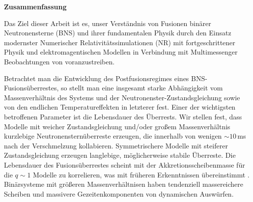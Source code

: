 \newpage 

%
%

\textbf{\Large{Zusammenfassung} }

Das Ziel dieser Arbeit ist es, unser Verständnis von Fusionen binärer Neutronensterne (BNS)
und ihrer fundamentalen Physik durch den Einsatz modernster Numerischer Relativit\"atssimulationen (NR) mit
fortgeschrittener Physik und elektromagentischen Modellen in Verbindung mit Multimessenger Beobachtungen von 
\GW{} voranzustreiben. 


Betrachtet man die Entwicklung des Postfusionsregimes eines BNS-Fusionsüberrestes, so stellt man eine insgesamt starke Abhängigkeit vom Massenverhältnis des Systems und der Neutronenster-Zustandsgleichung sowie von den 
endlichen Temperatureffekten in letzterer fest. Einer der wichtigsten betroffenen 
Parameter ist die Lebensdauer des Überrests. Wir stellen fest, dass Modelle mit 
weicher Zustandsgleichung und/oder großem Massenverhältnis kurzlebige Neutronensternüberreste erzeugen, die 
innerhalb von wenigen ${\sim}10\,$ms nach der Verschmelzung kollabieren. 
Symmetrischere Modelle mit steiferer Zustandsgleichung erzeugen langlebige, möglicherweise 
stabile Überreste. Die Lebensdauer des Fusionsüberrestes scheint mit der 
Akkretionsscheibenmasse für die $q\sim 1$ Modelle zu korrelieren, was mit früheren Erkenntnissen übereinstimmt 
\citep{Radice:2017lry,Radice:2018pdn}.
Binärsysteme mit größeren Massenverhältnisen haben tendenziell massereichere Scheiben und massivere Gezeitenkomponenten von dynamischen Auswürfen.

